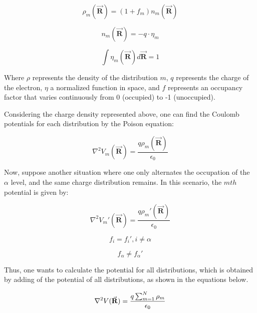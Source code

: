 \begin{equation}
    \rho_{m}(\vec{\mathbf{R}}) = (1+f_{m})n_{m}(\vec{\mathbf{R}}) 
\end{equation}

\begin{equation}
n_{m}(\vec{\mathbf{R}}) = -q \cdot \eta_{m}    
\end{equation}

\begin{equation}
 \int \eta_{m}(\vec{\mathbf{R}})d\vec{\mathbf{R}} = 1   
\end{equation}


Where $\rho$ represents the density of the distribution $m$, $q$ represents the charge of the electron, $\eta$ a normalized function in space, and $f$ represents an occupancy factor that varies continuously from 0 (occupied) to -1 (unoccupied).

Considering the charge density represented above, one can find the Coulomb potentials for each distribution
by the Poison equation:

\begin{equation}
   \nabla^{2}V_{m}(\vec{\mathbf{R}}) = \frac{q\rho_{m}(\vec{\mathbf{R}})}{\epsilon_{0}}
\end{equation}

Now, suppose another situation where one only alternates the occupation of the $\alpha$ level, and the same charge distribution remains. In this scenario, the $mth$ potential is given by:

\begin{equation}
\nabla^{2}V_{m}{'}(\vec{\mathbf{R}}) = \frac{q\rho_{m}{'}(\vec{\mathbf{R}})}{\epsilon_{0}}  
\end{equation}

\begin{equation}
f_{i}=f_{i}{'}, i \neq \alpha 
\end{equation}

\begin{equation}
f_{\alpha} \neq f_{\alpha}{'} 
\end{equation}

Thus, one wants to calculate the potential for all distributions, which is obtained by adding
of the potential of all distributions, as shown in the equations below.

\begin{equation}
\nabla^{2}V(\vec{\mathbf{R}}) = \frac{q\sum_{m=1}^{N}\rho_{m}}{\epsilon_{0}}   \\
\end{equation}

